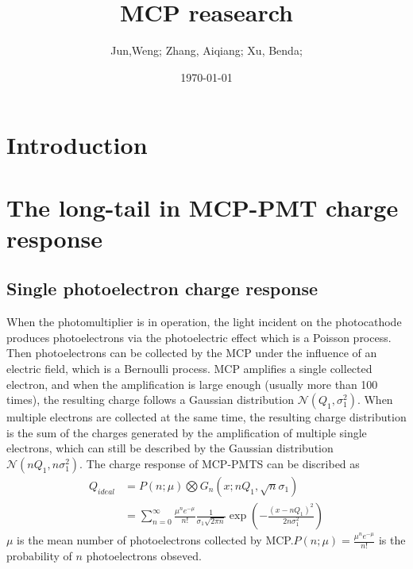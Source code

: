 \documentclass{article}
\title{MCP reasearch}
\author{Jun,Weng; Zhang, Aiqiang; Xu, Benda;} %
\date{\today}
\begin{document}
\maketitle
\section{Introduction}\label{sec:Introduction}
\section{The long-tail in MCP-PMT charge response }\label{sec:long-tail}
\subsection{Single photoelectron charge response}\label{subsec:statistical}
When the photomultiplier is in operation, the light incident on the photocathode produces photoelectrons via the photoelectric effect
which is a Poisson process. Then photoelectrons can be collected by the MCP under the influence of an electric field, which is a Bernoulli process.
MCP amplifies a single collected  electron, and when the amplification is large enough (usually more than 100 times),
the resulting charge follows a Gaussian distribution $\mathcal{N} (Q_1, \sigma_1^2)$. When multiple electrons are collected at the same time, the resulting charge
distribution is the sum of the charges generated by the amplification of multiple single electrons,
which can still be described by the Gaussian distribution $\mathcal{N} (nQ_1, n\sigma_1^2)$.
The charge response of MCP-PMTS can be discribed as ~\cite{1994Absolute}
\begin{equation}
    \begin{aligned}
        Q_{ideal} & = P(n;\mu)\bigotimes G_n(x;nQ_1,\sqrt{n}\sigma_1)                                                                      \\
                  & =\sum_{n = 0}^{\infty}\frac{\mu^n e^{-\mu}}{n!}\frac{1}{\sigma_1\sqrt{2\pi n}}\exp(-\frac{{(x-nQ_1)}^2}{2n\sigma_1^2})
    \end{aligned}
    \label{eq:sreal}
\end{equation}
$\mu$ is the mean number of photoelectrons collected by MCP.\@ $P(n;\mu) = \frac{\mu^n e^{-\mu}}{n!}$ is the probability of $n$ photoelectrons obseved.
\end{document}
